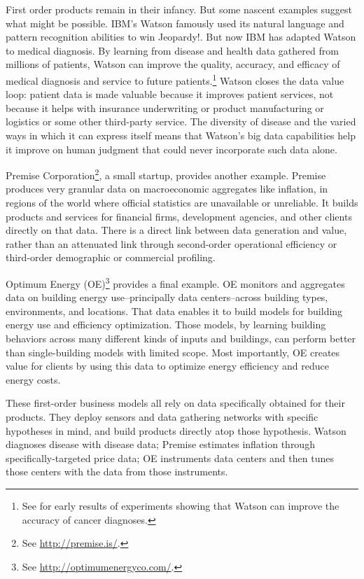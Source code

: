 \documentclass[12pt]{article}
\begin{document}
First order products remain in their infancy. But some nascent
examples suggest what might be possible. IBM's Watson famously used
its natural language and pattern recognition abilities to win
Jeopardy!. But now IBM has adapted Watson to medical diagnosis. By
learning from disease and health data gathered from millions of
patients, Watson can improve the quality, accuracy, and efficacy of
medical diagnosis and service to future patients.\footnote{See
\cite{wired2013a} for early results of experiments showing that Watson
can improve the accuracy of cancer diagnoses.} Watson closes the data
value loop: patient data is made valuable because it improves patient
services, not because it helps with insurance underwriting or product
manufacturing or logistics or some other third-party service. The
diversity of disease and the varied ways in which it can express
itself means that Watson's big data capabilities help it improve on
human judgment that could never incorporate such data alone.

Premise Corporation\footnote{See \url{http://premise.is/}.}, a small startup, provides another
example. Premise produces very granular data on macroeconomic
aggregates like inflation, in regions of the world where official
statistics are unavailable or unreliable. It builds products and
services for financial firms, development agencies, and other clients
directly on that data. There is a direct link between data
generation and value, rather than an attenuated link through
second-order operational efficiency or third-order demographic or
commercial profiling. 

Optimum Energy (OE)\footnote{See \url{http://optimumenergyco.com/}.} provides a final example. OE monitors and
aggregates data on building energy use--principally data
centers--across building types, environments, and locations. That data
enables it to build models for building energy use and efficiency
optimization. Those models, by learning building behaviors across many
different kinds of inputs and buildings, can perform better than
single-building models with limited scope. Most importantly, OE
creates value for clients by using this data to optimize energy
efficiency and reduce energy costs.

These first-order business models all rely on data specifically
obtained for their products. They deploy sensors and data gathering
networks with specific hypotheses in mind, and build products directly
atop those hypothesis. Watson diagnoses disease with disease data;
Premise estimates inflation through specifically-targeted price data;
OE instruments data centers and then tunes those centers with the data
from those instruments.
\end{document}
